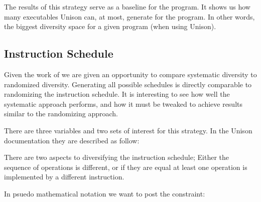 The results of this strategy serve as a baseline for the program. It shows us how many
executables Unison can, at most, generate for the program. In other words, the biggest
diversity space for a given program (when using Unison).

\subsection{Instruction Schedule}

Given the work of \textcite{large-scale-automated} we are given an opportunity to compare
systematic diversity to randomized diversity. Generating all possible schedules is directly
comparable to randomizing the instruction schedule. It is interesting to see how well
the systematic approach performs, and how it must be tweaked to achieve results similar
to the randomizing approach.

There are three variables and two sets of interest for this strategy. In the Unison documentation
they are described as follow:

\vspace{0.2cm}

\noindent{}

\vspace{0.2cm}

There are two aspects to diversifying the instruction schedule; Either the sequence of
operations is different, or if they are equal at least one operation is implemented by a
different instruction.

In psuedo mathematical notation we want to post the constraint:

\vspace{0.2cm}
\noindent{}
\vspace{0.2cm}

